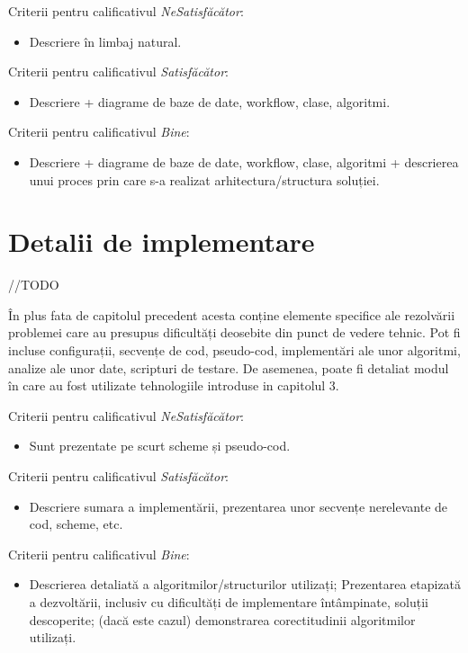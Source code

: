 \documentclass[12pt,a4paper]{report}
\begin{document}
Criterii pentru calificativul \textit{Ne\textit{Satisfăcător}}:
\begin{itemize}
	\item	Descriere în limbaj natural.
\end{itemize}

Criterii pentru calificativul \textit{Satisfăcător}:
\begin{itemize}
	\item	Descriere + diagrame de baze de date, workflow, clase, algoritmi.
\end{itemize}

Criterii pentru calificativul \textit{Bine}:
\begin{itemize}
	\item 	Descriere + diagrame de baze de date, workflow, clase, algoritmi + descrierea unui proces prin care s-a realizat arhitectura/structura soluției.
\end{itemize}

\chapter{Detalii de implementare}

//TODO

În plus fata de capitolul precedent acesta conține elemente specifice ale rezolvării problemei care au presupus dificultăți deosebite din punct de vedere tehnic. Pot fi incluse configurații, secvențe de cod, pseudo-cod, implementări ale unor algoritmi, analize ale unor date, scripturi de testare. De asemenea, poate fi detaliat modul în care au fost utilizate tehnologiile introduse in capitolul 3.


Criterii pentru calificativul \textit{Ne\textit{Satisfăcător}}:
\begin{itemize}
	\item	Sunt prezentate pe scurt scheme și pseudo-cod.
\end{itemize}
Criterii pentru calificativul \textit{Satisfăcător}:
\begin{itemize}
	\item	Descriere sumara a implementării, prezentarea unor secvențe nerelevante de cod, scheme, etc.
\end{itemize}
Criterii pentru calificativul \textit{Bine}:
\begin{itemize}
	\item	Descrierea detaliată a algoritmilor/structurilor utilizați; Prezentarea etapizată a dezvoltării, inclusiv cu dificultăți de implementare întâmpinate, soluții descoperite; (dacă este cazul) demonstrarea corectitudinii algoritmilor utilizați.
\end{itemize}
\end{document}
